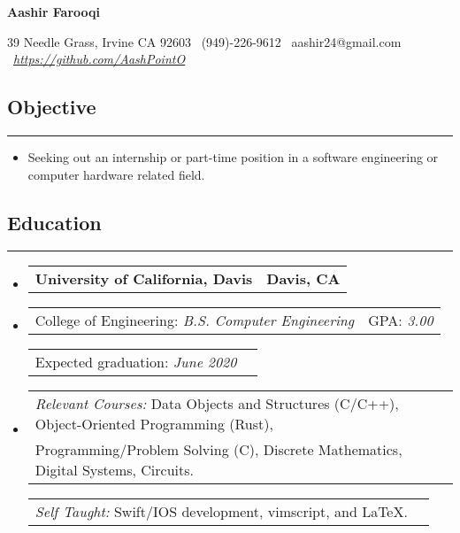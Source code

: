 \documentclass[10pt,letterpaper]{article}
\makeatletter
\newcommand{\header}[2]
{
	\begin{tabular*}{\linewidth}{l @{\extracolsep{\fill}} r}
		#1 & #2 \\
	\end{tabular*}
}
\newcommand{\sectionbreak}
{
	\vspace{-1.2em}
	\rule{\textwidth}{1.7pt}
	\vspace{-1.7em}
}
\makeatother
\begin{document}
\begin{center}
{\LARGE \textbf{Aashir Farooqi}}

\vspace{0.5em}
39 Needle Grass, Irvine CA 92603 \textbar 
\ (949)-226-9612 \textbar 
\ aashir24@gmail.com \textbar
\ \href{https://github.com/AashPointO}{\emph{\underline{https://github.com/AashPointO}}}
\\
\end{center}
\vspace{-1.5em}

\subsection*{Objective}
\sectionbreak

\begin{itemize}
	\item[] Seeking out an internship or part-time position in a software engineering or computer hardware related field.

\end{itemize}

\vspace{-1.5em}

\subsection*{Education}
\sectionbreak

\begin{itemize}

\item[] 
	\header 
		{\textbf{University of California, Davis}}
		{\textbf{Davis, CA}}
\item[]
	\header
		{College of Engineering: \emph{B.S. Computer Engineering}}
		{GPA: \emph{3.00}}
	\header
		{Expected graduation: \emph{June 2020}}	
		{}
\item[]
	\header
		{\emph{Relevant Courses:} Data Objects and Structures (C/C++), Object-Oriented Programming (Rust), \\ \hspace{7.25em} Programming/Problem Solving (C), Discrete Mathematics, Digital Systems, Circuits.} 
		{}
	\header
		{\emph{Self Taught:} \hspace{2.0em} Swift/IOS development, vimscript, and \LaTeX.}
		{}
	
\end{itemize}

\vspace{-2.5em}
\end{document}
